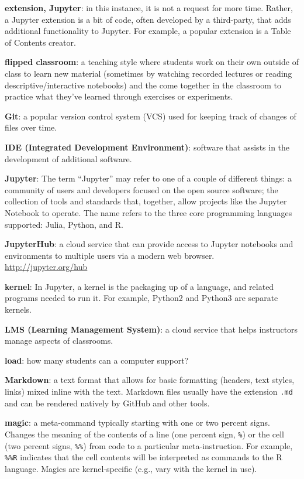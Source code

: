 \documentclass[]{book}
\begin{document}
\textbf{extension, Jupyter}: in this instance, it is not a request for more time.
Rather, a Jupyter extension is a bit of code, often developed by a third-party,
that adds additional functionality to Jupyter. For example, a popular extension is a
Table of Contents creator.

\textbf{flipped classroom}: a teaching style where students work on their own outside of class
to learn new material (sometimes by watching recorded lectures or reading descriptive/interactive
notebooks) and the come together in the classroom to practice what they've learned through
exercises or experiments.

\textbf{Git}: a popular version control system (VCS) used for keeping track of changes of files over time.

\textbf{IDE (Integrated Development Environment)}: software that assists in the development
of additional software.

\textbf{Jupyter}: The term ``Jupyter'' may refer to one of a couple of different things:
a community of users and developers focused on the open source software; the collection
of tools and standards that, together, allow projects like the Jupyter Notebook to operate.
The name refers to the three core programming languages supported:
Julia, Python, and R.

\textbf{JupyterHub}: a cloud service that can provide access to Jupyter notebooks and
environments to multiple users via a modern web browser. \url{http://jupyter.org/hub}

\textbf{kernel}: In Jupyter, a kernel is the packaging up of a language, and related programs
needed to run it. For example, Python2 and Python3 are separate kernels.

\textbf{LMS (Learning Management System)}: a cloud service that helps instructors manage
aspects of classrooms.

\textbf{load}: how many students can a computer support?

\textbf{Markdown}: a text format that allows for basic formatting (headers, text styles, links)
mixed inline with the text. Markdown files usually have the extension \texttt{.md} and
can be rendered natively by GitHub and other tools.

\textbf{magic}: a meta-command typically starting with one or two percent signs.
Changes the meaning of the contents of a line (one percent sign, \texttt{\%}) or the cell
(two percent signs, \texttt{\%\%}) from code to a particular meta-instruction.
For example, \texttt{\%\%R} indicates that the cell contents will be interpreted as commands
to the R language. Magics are kernel-specific (e.g., vary with the kernel in use).
\end{document}
